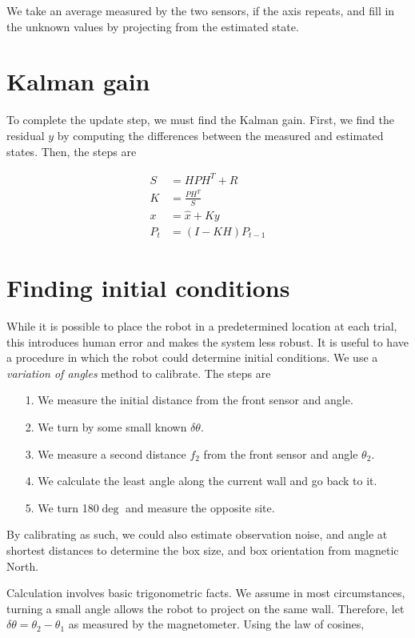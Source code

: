 \documentclass[11pt]{article}
\begin{document}
We take an average measured by the two sensors, if the axis repeats, and fill in the unknown values by projecting from the estimated state.

\section{Kalman gain}

To complete the update step, we must find the Kalman gain. First, we find the residual $y$ by computing the differences between the measured and estimated states. Then, the steps are

\begin{align}
S & = HPH^T + R \\
K & = \frac{PH^T}{S} \\
x & = \hat{x} + Ky \\
P_t & = (I - KH) P_{t-1}
\end{align}

\section{Finding initial conditions}

While it is possible to place the robot in a predetermined location at each trial, this introduces human error and makes the system less robust. It is useful to have a procedure in which the robot could determine initial conditions. We use a \emph{variation of angles} method to calibrate. The steps are

\begin{enumerate}
\item[1.] We measure the initial distance from the front sensor and angle.
\item[2.] We turn by some small known $\delta \theta$.
\item[3.] We measure a second distance $f_2$ from the front sensor and angle $\theta_2$.
\item[4.] We calculate the least angle along the current wall and go back to it.
\item[5.] We turn 180$\deg$ and measure the opposite site.
\end{enumerate}

By calibrating as such, we could also estimate observation noise, and angle at shortest distances to determine the box size, and box orientation from magnetic North.

Calculation involves basic trigonometric facts. We assume in most circumstances, turning a small angle allows the robot to project on the same wall. Therefore, let $\delta \theta = \theta_2 - \theta_1$ as measured by the magnetometer. Using the law of cosines,
\end{document}
